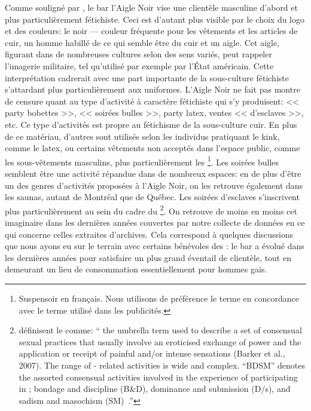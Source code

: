 Comme souligné par \citet{Giraud2013a}, le bar l'Aigle Noir vise une clientèle masculine d'abord et plus particulièrement fétichiste.
Ceci est d'autant plus visible par le choix du logo et des couleurs: le noir --- couleur fréquente pour les vêtements et les articles de cuir, un homme habillé de ce qui semble être du cuir et un aigle.
Cet aigle, figurant dans de nombreuses cultures selon des sens variés, peut rappeler l'imagerie militaire, tel qu'utilisé par exemple par l'État américain.
Cette interprétation cadrerait avec une part importante de la sous-culture fétichiste s'attardant plus particulièrement aux uniformes.
L'Aigle Noir ne fait pas montre de censure quant au type d'activité à caractère fétichiste qui s'y produisent: << party bobettes >>, << soirées bulles >>, party latex, ventes << d'esclaves >>, etc.
Ce type d'activités est propre au fétichisme de la sous-culture cuir.
En plus de ce matériau, d'autres sont utilisés selon les individus pratiquant le kink, comme le latex, ou certains vêtements non acceptés dans l'espace public, comme les sous-vêtements masculins, plus particulièrement les \footnote{Suspensoir en français. Nous utilisons de préférence le terme  en concordance avec le terme utilisé dans les publicités. }.
Les soirées bulles semblent être une activité répandue dans de nombreux espaces: en de plus d'être un des genres d'activités proposées à l'Aigle Noir, on les retrouve également dans les saunas, autant de Montréal que de Québec.
Les soirées d'esclaves s'inscrivent plus particulièrement au sein du cadre du \bdsm{}\footnote{\citeauthor{ Turley2015} définisent le \bdsm{} comme: \foreignquote{ english}{\textelp{} the umbrella term used to describe a set of consensual sexual practices that usually involve an eroticised exchange of power and the application or receipt of painful and/or intense sensations (Barker et al., 2007).
The range of \bdsm{}- related activities is wide and complex.
“BDSM” denotes the assorted consensual activities involved in the experience of participating in \bdsm{}; bondage and discipline (B\&D), dominance and submission (D/s), and sadism and masochism (SM)~\citeyearpar[24]{Turley2015}.}}.
On retrouve de moins en moins cet imaginaire dans les dernières années couvertes par notre collecte de données en ce qui concerne celles extraites d'archives.
Cela correspond à quelques discussions que nous ayons eu sur le terrain avec certains bénévoles des \agq{}: le bar a évolué dans les dernières années pour satisfaire un plus grand éventail de clientèle, tout en demeurant un lieu de consommation essentiellement pour hommes gais.

